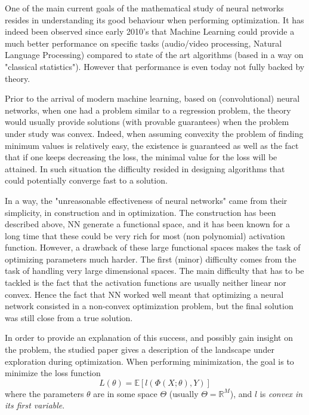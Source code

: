 \documentclass[11pt]{article} %
\begin{document}
One of the main current goals of the mathematical study of neural networks resides in understanding its good behaviour when performing optimization. 
It has indeed been observed since early 2010's that Machine Learning could provide a much better performance on specific tasks (audio/video processing, Natural Language Processing) compared to state of the art algorithms (based in a way on "classical statistics").
However that performance is even today not fully backed by theory. 
\par
Prior to the arrival of modern machine learning, based on (convolutional) neural networks, when one had a problem similar to a regression problem, the theory would usually provide solutions (with provable guarantees) when the problem under study was convex.
Indeed, when assuming convexity the problem of finding minimum values is relatively easy, the existence is guaranteed as well as the fact that if one keeps decreasing the loss, the minimal value for the loss will be attained. 
In such situation the difficulty resided in designing algorithms that could potentially converge fast to a solution.
\par
In a way, the "unreasonable effectiveness of neural networks" came from their simplicity, in construction and in optimization.
The construction has been described above, NN generate a functional space, and it has been known for a long time that these could be very rich for most (non polynomial) activation function. 
However, a drawback of these large functional spaces makes the task of optimizing parameters much harder. The first (minor) difficulty comes from the task of handling very large dimensional spaces.
The main difficulty that has to be tackled is the fact that the activation functions are usually neither linear nor convex. Hence the fact that NN worked well meant that optimizing a neural network consisted in a non-convex optimization problem, but the final solution was still close from a true solution.
\par
In order to provide an explanation of this success, and possibly gain insight on the problem, the studied paper gives a description of the landscape under exploration during optimization.
When performing minimization, the goal is to minimize the loss function
\begin{equation}
	L(\theta) = \mathbb{E}[l(\Phi(X;\theta), Y)]
\end{equation}
where the parameters $\theta$ are in some space $\Theta$ (usually $\Theta = \mathbb{R}^M$), and $l$ is \emph{convex in its first variable}.
\end{document}
